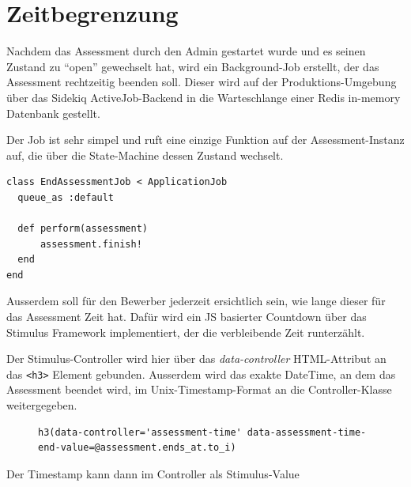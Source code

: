 \section{Zeitbegrenzung}

Nachdem das Assessment durch den Admin gestartet wurde und es seinen Zustand zu \enquote{open} gewechselt hat, wird
ein Background-Job erstellt, der das Assessment rechtzeitig beenden soll. Dieser wird auf der Produktions-Umgebung 
über das Sidekiq ActiveJob-Backend in die Warteschlange einer Redis in-memory Datenbank gestellt. 

Der Job ist sehr simpel und ruft eine einzige Funktion auf der Assessment-Instanz auf, 
die über die State-Machine dessen Zustand wechselt. 

\begin{codebox}
\begin{verbatim}
class EndAssessmentJob < ApplicationJob
  queue_as :default

  def perform(assessment)
      assessment.finish!
  end
end
\end{verbatim}
\end{codebox}

Ausserdem soll für den Bewerber jederzeit ersichtlich sein, wie lange dieser für das Assessment Zeit hat. 
Dafür wird ein JS basierter Countdown über das Stimulus Framework implementiert, der die verbleibende Zeit runterzählt.

Der Stimulus-Controller wird hier über das \emph{data-controller} HTML-Attribut an das \texttt{<h3>} Element gebunden.
Ausserdem wird das exakte DateTime, an dem das Assessment beendet wird, im Unix-Timestamp-Format an die Controller-Klasse weitergegeben.

\begin{figure}[H]
\begin{codebox}
\begin{verbatim}
h3(data-controller='assessment-time' data-assessment-time-end-value=@assessment.ends_at.to_i)
\end{verbatim}
\end{codebox}
\end{figure}

Der Timestamp kann dann im Controller als Stimulus-Value 

